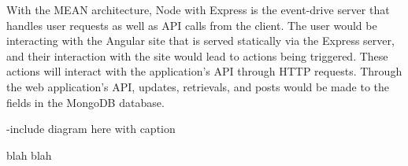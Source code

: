 \documentclass[12pt]{article}
\begin{document}
With the MEAN architecture, Node with Express is the event-drive server that handles user requests as well as API calls from the client. The user would be interacting with the Angular site that is served statically via the Express server, and their interaction with the site would lead to actions being triggered. These actions will interact with the application's API through HTTP requests. Through the web application's API, updates, retrievals, and posts would be made to the fields in the MongoDB database.

-include diagram here with caption

\newpage

blah blah

\newpage
\end{document}
